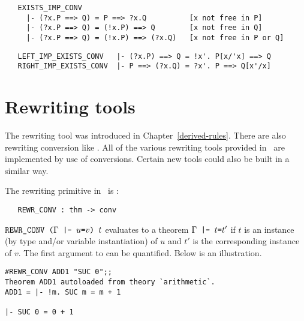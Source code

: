 \begin{hol}\begin{verbatim}
   EXISTS_IMP_CONV
     |- (?x.P ==> Q) = P ==> ?x.Q          [x not free in P]
     |- (?x.P ==> Q) = (!x.P) ==> Q        [x not free in Q]
     |- (?x.P ==> Q) = (!x.P) ==> (?x.Q)   [x not free in P or Q]
\end{verbatim}\end{hol}

\begin{hol}\begin{verbatim}
   LEFT_IMP_EXISTS_CONV   |- (?x.P) ==> Q = !x'. P[x/'x] ==> Q
   RIGHT_IMP_EXISTS_CONV  |- P ==> (?x.Q) = ?x'. P ==> Q[x'/x]
\end{verbatim}\end{hol}


\section{Rewriting tools}
\label{avra3}

The rewriting tool
 was introduced
in Chapter~\ref{derived-rules}.
There are also rewriting conversion like .
All of the various rewriting tools provided in \HOL\
are implemented by use of conversions.
Certain new tools could also be built in a similar way.

The rewriting primitive in \HOL\ is :

\begin{holboxed}
\begin{verbatim}
   REWR_CONV : thm -> conv
\end{verbatim}\end{holboxed}

\noindent $\ml{REWR\_CONV (}\Gamma\ml{ |- }u \ml{=}v\ml{) }t$ evaluates to a
theorem $\Gamma\ml{ |- }t\ml{=}t'$
if $t$ is an instance (by type and/or variable instantiation)
of $u$ and $t'$ is the corresponding instance of $v$.
The first argument to  can be quantified.
Below is an illustration.

\setcounter{sessioncount}{1}
\begin{session}\begin{verbatim}
#REWR_CONV ADD1 "SUC 0";;
Theorem ADD1 autoloaded from theory `arithmetic`.
ADD1 = |- !m. SUC m = m + 1

|- SUC 0 = 0 + 1
\end{verbatim}\end{session}

